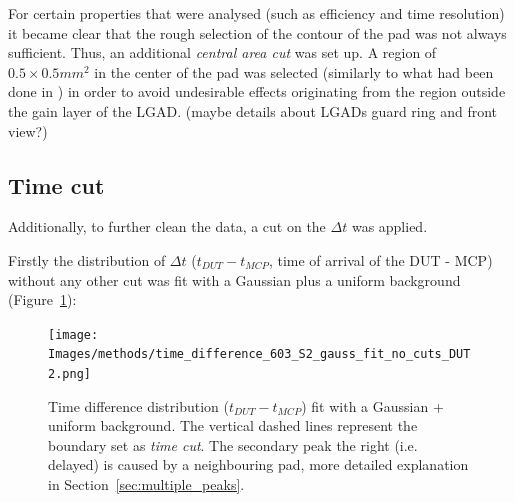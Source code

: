 
For certain properties that were analysed (such as efficiency and time resolution) it became clear that the rough selection of the contour of the pad was not always sufficient. Thus, an additional \textit{central area cut} was set up. A region of \(0.5\times0.5\si{mm^2}\) in the center of the pad was selected (similarly to what had been done in \cite{Agapopoulou_2022}) in order to avoid undesirable effects originating from the region outside the gain layer of the LGAD. (maybe details about LGADs guard ring and front view?)

\begin{figure}[!ht]
    \centering
    \hfill
\end{figure}

\subsection{Time cut}\label{subsec:time_cut}

Additionally, to further clean the data, a cut on the $\Delta t$ was applied.

Firstly the distribution of $\Delta t$ ($t_{DUT}-t_{MCP}$, time of arrival of the DUT - MCP) without any other cut was fit with a Gaussian plus a uniform background (Figure~\ref{fig:time_cut_gauss+bg_fit}):

\begin{figure}[!ht]
    \centering
    \texttt{[image: Images/methods/time\_difference\_603\_S2\_gauss\_fit\_no\_cuts\_DUT2.png]}
    \caption{Time difference distribution ($t_{DUT}-t_{MCP}$) fit with a Gaussian + uniform background. The vertical dashed lines represent the boundary set as \textit{time cut}. The secondary peak 
     the right (i.e. delayed) is caused by a neighbouring pad, more detailed explanation in Section~\ref{sec:multiple_peaks}.}
    \label{fig:time_cut_gauss+bg_fit}
\end{figure}

